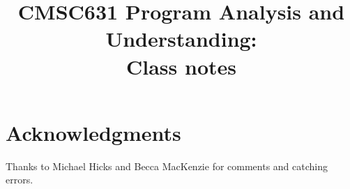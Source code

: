 \documentclass[11pt]{article}
\title{CMSC631 Program Analysis and Understanding:\\
  Class notes}
\begin{document}
\maketitle
\tableofcontents


\newpage


\newpage




\appendix
\section{Acknowledgments}

Thanks to Michael Hicks and Becca MacKenzie for comments and catching errors.
\end{document}
